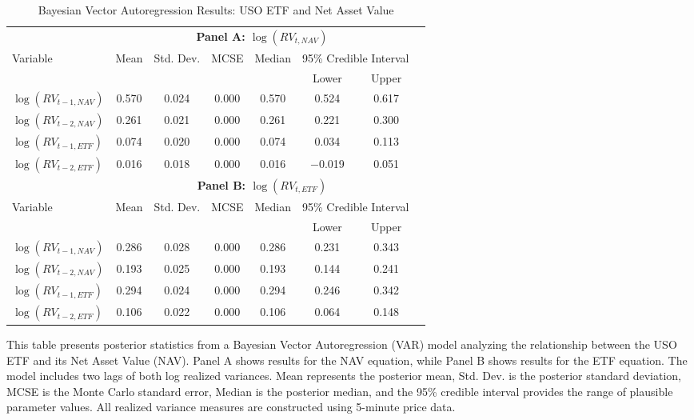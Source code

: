 \begin{landscape}
\begin{table}[htbp]
\centering
\caption{Bayesian Vector Autoregression Results: USO ETF and Net Asset Value}
\label{tab:VAR_USO}
\begin{threeparttable}
\footnotesize
\begin{tabular}{@{}lccccccc@{}}
\toprule
 & \multicolumn{6}{c}{\textbf{Panel A: $\log(RV_{t,NAV})$}} \\
\cmidrule(lr){2-7}
Variable & Mean & Std. Dev. & MCSE & Median & \multicolumn{2}{c}{95\% Credible Interval} \\
\cmidrule(lr){6-7}
 &  &  &  &  & Lower & Upper \\
\midrule
$\log(RV_{t-1,NAV})$ & 0.570 & 0.024 & 0.000 & 0.570 & 0.524 & 0.617 \\
$\log(RV_{t-2,NAV})$ & 0.261 & 0.021 & 0.000 & 0.261 & 0.221 & 0.300 \\
$\log(RV_{t-1,ETF})$ & 0.074 & 0.020 & 0.000 & 0.074 & 0.034 & 0.113 \\
$\log(RV_{t-2,ETF})$ & 0.016 & 0.018 & 0.000 & 0.016 & $-$0.019 & 0.051 \\
\addlinespace[0.3cm]

 & \multicolumn{6}{c}{\textbf{Panel B: $\log(RV_{t,ETF})$}} \\
\cmidrule(lr){2-7}
Variable & Mean & Std. Dev. & MCSE & Median & \multicolumn{2}{c}{95\% Credible Interval} \\
\cmidrule(lr){6-7}
 &  &  &  &  & Lower & Upper \\
\midrule
$\log(RV_{t-1,NAV})$ & 0.286 & 0.028 & 0.000 & 0.286 & 0.231 & 0.343 \\
$\log(RV_{t-2,NAV})$ & 0.193 & 0.025 & 0.000 & 0.193 & 0.144 & 0.241 \\
$\log(RV_{t-1,ETF})$ & 0.294 & 0.024 & 0.000 & 0.294 & 0.246 & 0.342 \\
$\log(RV_{t-2,ETF})$ & 0.106 & 0.022 & 0.000 & 0.106 & 0.064 & 0.148 \\
\bottomrule
\end{tabular}
\begin{tablenotes}
\small
\item This table presents posterior statistics from a Bayesian Vector Autoregression (VAR) model analyzing the relationship between the USO ETF and its Net Asset Value (NAV). Panel A shows results for the NAV equation, while Panel B shows results for the ETF equation. The model includes two lags of both log realized variances. Mean represents the posterior mean, Std. Dev. is the posterior standard deviation, MCSE is the Monte Carlo standard error, Median is the posterior median, and the 95\% credible interval provides the range of plausible parameter values. All realized variance measures are constructed using 5-minute price data.
\end{tablenotes}
\end{threeparttable}
\end{table}
\end{landscape}

